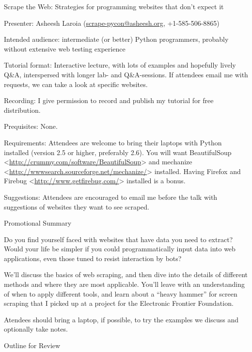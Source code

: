 \documentclass[10pt,a4paper,english]{article}
\title{}
\author{}
\date{}
\newlength{\locallinewidth}
\begin{document}
\setlength{\locallinewidth}{\linewidth}

Scrape the Web: Strategies for programming websites that don't expect it

Presenter: Asheesh Laroia (\href{mailto:scrape-pycon@asheesh.org}{scrape-pycon@asheesh.org}, +1-585-506-8865)

Intended audience: intermediate (or better) Python programmers, probably without extensive web testing experience

Tutorial format: Interactive lecture, with lots of examples and hopefully lively Q{\&}A, interspersed with longer lab- and Q{\&}A-sessions.  If attendees email me with requests, we can take a look at specific websites.

Recording: I give permission to record and publish my tutorial for free distribution.

Prequisites: None.

Requirements: Attendees are welcome to bring their laptops with Python installed (version 2.5 or higher, preferably 2.6).  You will want BeautifulSoup {\textless}\href{http://crummy.com/software/BeautifulSoup}{http://crummy.com/software/BeautifulSoup}{\textgreater} and mechanize {\textless}\href{http://wwwsearch.sourceforge.net/mechanize/}{http://wwwsearch.sourceforge.net/mechanize/}{\textgreater} installed.  Having Firefox and Firebug {\textless}\href{http://www.getfirebug.com/}{http://www.getfirebug.com/}{\textgreater} installed is a bonus.

Suggestions: Attendees are encouraged to email me before the talk with suggestions of websites they want to see scraped.

Promotional Summary

Do you find yourself faced with websites that have data you need to extract? Would your life be simpler if you could
programmatically input data into web applications, even those tuned to resist interaction by bots?

We'll discuss the basics of web scraping, and then dive into the details of different methods and where they are most applicable.
You'll leave with an understanding of when to apply different tools, and learn about a ``heavy hammer'' for screen scraping that
I picked up at a project for the Electronic Frontier Foundation.

Atendees should bring a laptop, if possible, to try the examples we discuss and optionally take notes.

Outline for Review
\end{document}
